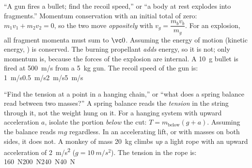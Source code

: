 {``A gun fires a bullet; find the recoil speed,'' or ``a body at rest explodes into fragments.''}
{Momentum conservation with an initial total of zero: $m_1v_1+m_2v_2=0$, so the two move
\emph{oppositely} with $v_g=\dfrac{m_bv_b}{m_g}$. For an explosion, all fragment momenta must sum
to $\vc0$.}
{Assuming the energy of motion (kinetic energy, ) is conserved. The burning propellant
\emph{adds} energy, so it is not; only momentum is, because the forces of the explosion are internal.}
{A \SI{10}{g} bullet is fired at \SI{500}{m/s} from a \SI{5}{kg} gun. The recoil speed of the gun is:}
{\SI{1}{m/s}}{\SI{0.5}{m/s}}{\SI{2}{m/s}}{\SI{5}{m/s}}

{``Find the tension at a point in a hanging chain,'' or ``what does a spring balance read between two
masses?''}
{A spring balance reads the \emph{tension} in the string through it, not the weight hung on it. For a
hanging system with upward acceleration $a$, isolate the portion \emph{below} the cut:
$T=m_{\text{below}}(g+a)$.}
{Assuming the balance reads $mg$ regardless. In an accelerating lift, or with masses on both sides, it
does not.}
{A monkey of mass \SI{20}{kg} climbs \emph{up} a light rope with an upward acceleration of
\SI{2}{m/s^2} ($g=\SI{10}{m/s^2}$). The tension in the rope is:}
{\SI{160}{N}}{\SI{200}{N}}{\SI{240}{N}}{\SI{40}{N}}
